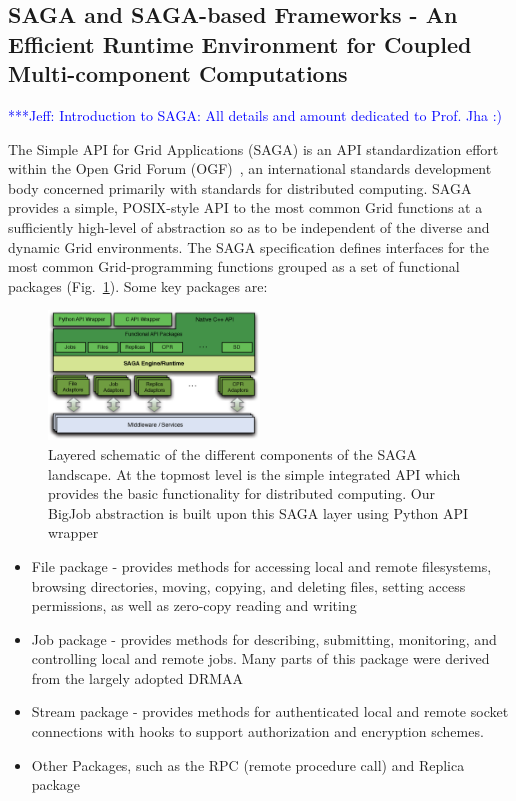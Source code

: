 \documentclass[conference,final]{IEEEtran}
\newcommand{\skonote}[1]{ {\textcolor{blue} { ***Jeff: #1 }}}
\newcommand{\skonote}[1]{}
\begin{document}
\subsection{SAGA and SAGA-based Frameworks - An Efficient Runtime Environment for Coupled Multi-component Computations}

\skonote{Introduction to SAGA: All details and amount dedicated to Prof. Jha :) }

The Simple API for Grid Applications (SAGA) is an API standardization effort within the Open Grid Forum (OGF)~\cite{ogf_web}, an international standards development body concerned primarily with standards for distributed computing. SAGA provides a simple, POSIX-style API to the most common Grid functions at a sufficiently high-level of abstraction so as to be independent of the diverse and dynamic Grid environments. The SAGA specification defines interfaces for the most common Grid-programming functions grouped as a set of functional packages (Fig.~\ref{Fig:SAGA1}). Some key packages are:

\begin{figure}
 \begin{center}
     \includegraphics[width=0.50\textwidth]{stci_saga_figures-1.eps}
 \end{center}
\caption{\small Layered schematic of the different components of the SAGA landscape. At the topmost level is the simple integrated API which provides the basic functionality for distributed computing. Our BigJob abstraction is built upon this SAGA layer using Python API wrapper}
 \label{Fig:SAGA1}
 \vspace{-1em}
\end{figure}

\begin{itemize}
\item File package - provides methods for accessing local and remote filesystems, browsing directories, moving, copying, and deleting files, setting access permissions, as well as zero-copy reading and writing
\item Job package - provides methods for describing, submitting, monitoring, and controlling local and remote jobs. Many parts of this package were derived from the largely adopted DRMAA %
\item Stream package - provides methods for authenticated local and remote socket connections with hooks to support authorization and encryption schemes.
\item Other Packages, such as the RPC (remote procedure call) and Replica package
\end{itemize}
\end{document}
